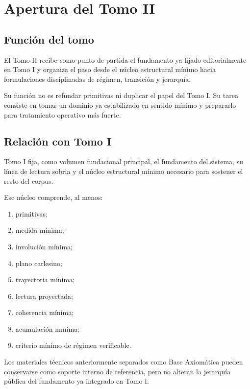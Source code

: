 \chapter{Apertura del Tomo II}

\section{Función del tomo}
\begin{observation}
El Tomo II recibe como punto de partida el fundamento ya fijado editorialmente en Tomo I y organiza el paso desde el núcleo estructural mínimo hacia formulaciones disciplinadas de régimen, transición y jerarquía.
\end{observation}

\begin{observation}
Su función no es refundar primitivas ni duplicar el papel del Tomo I. Su tarea consiste en tomar un dominio ya estabilizado en sentido mínimo y prepararlo para tratamiento operativo más fuerte.
\end{observation}

\section{Relación con Tomo I}
\begin{observation}
Tomo I fija, como volumen fundacional principal, el fundamento del sistema, su línea de lectura sobria y el núcleo estructural mínimo necesario para sostener el resto del corpus.
\end{observation}

\begin{observation}
Ese núcleo comprende, al menos:
\begin{enumerate}
  \item primitivas;
  \item medida mínima;
  \item involución mínima;
  \item plano carlesino;
  \item trayectoria mínima;
  \item lectura proyectada;
  \item coherencia mínima;
  \item acumulación mínima;
  \item criterio mínimo de régimen verificable.
\end{enumerate}
\end{observation}

\begin{observation}
Los materiales técnicos anteriormente separados como Base Axiomática pueden conservarse como soporte interno de referencia, pero no alteran la jerarquía pública del fundamento ya integrado en Tomo I.
\end{observation}

